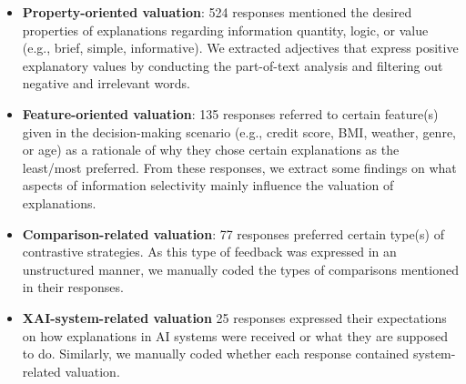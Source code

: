 \begin{itemize}
    \item \textbf{Property-oriented valuation}: 524 responses mentioned the desired properties of explanations regarding information quantity, logic, or value (e.g., brief, simple, informative). We extracted adjectives that express positive explanatory values by conducting the part-of-text analysis and filtering out negative and irrelevant words.
    
    \item \textbf{Feature-oriented valuation}: 135 responses referred to certain feature(s) given in the decision-making scenario (e.g., credit score, BMI, weather, genre, or age) as a rationale of why they chose certain explanations as the least/most preferred. From these responses, we extract some findings on what aspects of information selectivity mainly influence the valuation of explanations.
    
    \item \textbf{Comparison-related valuation}: 77 responses preferred certain type(s) of contrastive strategies. As this type of feedback was expressed in an unstructured manner, we manually coded the types of comparisons mentioned in their responses.
    \item \textbf{XAI-system-related valuation}
    25 responses expressed their expectations on how explanations in AI systems were received or what they are supposed to do. Similarly, we manually coded whether each response contained system-related valuation.
\end{itemize}




